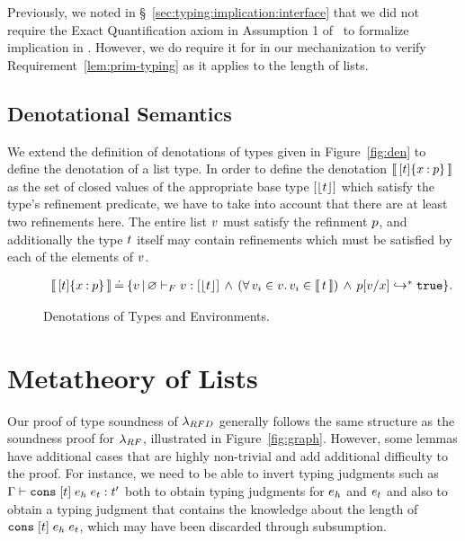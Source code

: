 Previously, we noted in \S~\ref{sec:typing:implication:interface}
that we did not require the Exact Quantification axiom in
Assumption 1 of~\cite{Knowles09} to formalize implication in \sysrf.
% 
However, we do require it for \sysrfd in our mechanization 
to verify Requirement~\ref{lem:prim-typing} as it applies to the
length of lists.

\subsection{Denotational Semantics}
\label{sec:lists:denotational}

We extend the definition of denotations of types given
in Figure~\ref{fig:den} to define the denotation of a list type.
%
In order to define the denotation 
$\llbracket\, {{[t]}\{x \mathbin{:} p\}} \,\rrbracket$
as the set of closed values
of the appropriate base type $[\lfloor{t}\rfloor]$
which satisfy the type's refinement predicate,
we have to take into account that there are at least two
refinements here. The entire list $v$ must satisfy
the refinment $p$, and additionally the type
$t$ itself may contain refinements which must
be satisfied by each of the elements of $v$.

\begin{figure}
$$\begin{array}{r@{\hskip 0.03in}c@{\hskip 0.03in}l}
\denote{\breft{\listtype{\stype}}{x}{p}} & \defeq &
  \setcomp{\sval}{\hasftype{\varnothing}{\sval}{\listtype{\forgetreft{\stype}}} 
  \,\wedge\, (\forall\, v_i\in v.\, v_i \in \denote{t})
  \,\wedge\, \evalsTo{\subst{p}{x}{\sval}}{\ttrue}}.
\end{array}$$
\vspace{-0.0cm}
\caption{Denotations of Types and Environments.}
\label{fig:denD}
\vspace{-0.0cm}
\end{figure}

\section{Metatheory of Lists}

Our proof of type soundness of $\lambda_{RFD}$ generally follows
the same structure as the soundness proof for $\lambda_{RF}$,
illustrated in Figure~\ref{fig:graph}.
%
However, some lemmas have additional cases that are highly 
non-trivial and add additional difficulty to the proof. 
%
For instance, we need to be able to invert typing judgments
such as 
${\mathrm{\Gamma}} \vdash {\ensuremath{\texttt{cons}\;[{t}]\;{e_h}\;{e_t}}} : {t'}$
both to obtain typing judgments for $e_h$ and $e_t$
and also to obtain a typing judgment that contains the 
knowledge about the length of $\texttt{cons}\;[{t}]\;{e_h}\;{e_t}$,
which may have been discarded through subsumption.

